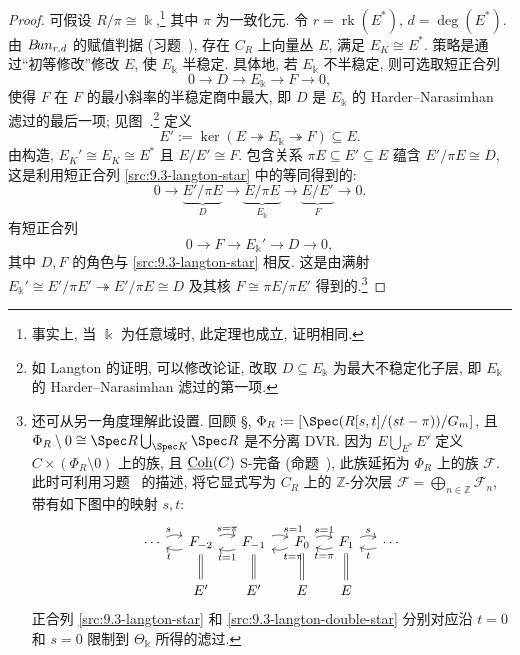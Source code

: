 \begin{proof}
可假设 $R/\pi\cong\Bbbk$,\footnote{事实上, 当 $\Bbbk$ 为任意域时, 此定理也成立, 证明相同.} 其中 $\pi$ 为一致化元. 令 $r=\operatorname{rk}(E^*)$, $d=\deg(E^*)$. 由 $B\!un_{r,d}$ 的赋值判据 (习题~), 存在 $C_R$ 上向量丛 $E$, 满足 $E_K\cong E^*$. 策略是通过``初等修改''修改 $E$, 使 $E_{\Bbbk}$ 半稳定. 具体地, 若 $E_{\Bbbk}$ 不半稳定, 则可选取短正合列
\begin{equation*}\tag{$\star$}\label{src:9.3-langton-star}
0\to D\to E_{\Bbbk}\to F\to0,
\end{equation*}
使得 $F$ 在 $F$ 的最小斜率的半稳定商中最大, 即 $D$ 是 $E_{\Bbbk}$ 的 Harder--Narasimhan 滤过的最后一项; 见图~.\footnote{如 Langton 的证明, 可以修改论证, 改取 $D\subseteq E_{\Bbbk}$ 为最大不稳定化子层, 即 $E_{\Bbbk}$ 的 Harder--Narasimhan 滤过的第一项.} 定义
\[
E':=\ker(E\twoheadrightarrow E_{\Bbbk}\twoheadrightarrow F)\subseteq E.
\]
由构造, $E_K'\cong E_K\cong E^*$ 且 $E/E'\cong F$. 包含关系 $\pi E\subseteq E'\subseteq E$ 蕴含 $E'/\pi E\cong D$, 这是利用短正合列 \eqref{src:9.3-langton-star} 中的等同得到的:
\[
0\to\underbrace{E'/\pi E}_D\to\underbrace{E/\pi E}_{E_{\Bbbk}}\to\underbrace{E/E'}_F\to0.
\]
有短正合列
\begin{equation*}\tag{$\star\star$}\label{src:9.3-langton-double-star}
0\to F\to E_{\Bbbk}'\to D\to0,
\end{equation*}
其中 $D,F$ 的角色与 \eqref{src:9.3-langton-star} 相反. 这是由满射 $E_{\Bbbk}'\cong E'/\pi E'\twoheadrightarrow E'/\pi E\cong D$ 及其核 $F\cong\pi E/\pi E'$ 得到的.\footnote{还可从另一角度理解此设置. 回顾 \S{}, $\Phi_R:=[\Spec(R[s,t]/(st-\pi))/\mathbb G_m]$, 且 $\Phi_R\setminus0\cong\Spec R\bigcup_{\Spec K}\Spec R$ 是不分离 DVR. 因为 $E\bigcup_{E^*}E'$ 定义 $C\times(\Phi_R\setminus0)$ 上的族, 且 $\underline{\mathrm{Coh}}(C)$ S-完备 (命题~), 此族延拓为 $\Phi_R$ 上的族 $\mathcal F$. 此时可利用习题~ 的描述, 将它显式写为 $C_R$ 上的 $\mathbb Z$-分次层 $\mathcal F=\bigoplus_{n\in\mathbb Z}\mathcal F_n$, 带有如下图中的映射 $s,t$:
\[
\begin{tikzcd}[ampersand replacement=\&,column sep=small]
\cdots\arrow[r,bend left=20,"s"]\&\mathcal F_{-2}\arrow[l,bend left=20,"t"]\arrow[r,bend left=20,"{s=\pi}"]\arrow[d,equal]\&\mathcal F_{-1}\arrow[l,bend left=20,"{t=1}"]\arrow[r,bend left=20,"{s=1}"]\arrow[d,equal]\&\mathcal F_0\arrow[l,bend left=20,"{t=\pi}"]\arrow[r,bend left=20,"{s=1}"]\arrow[d,equal]\&\mathcal F_1\arrow[l,bend left=20,"{t=\pi}"]\arrow[r,bend left=20,"s"]\arrow[d,equal]\&\cdots\arrow[l,bend left=20,"t"]\\
\&E'\&E'\&E\&E\&{}
\end{tikzcd}
\]
正合列 \eqref{src:9.3-langton-star} 和 \eqref{src:9.3-langton-double-star} 分别对应沿 $t=0$ 和 $s=0$ 限制到 $\Theta_{\Bbbk}$ 所得的滤过.}


\end{proof}
